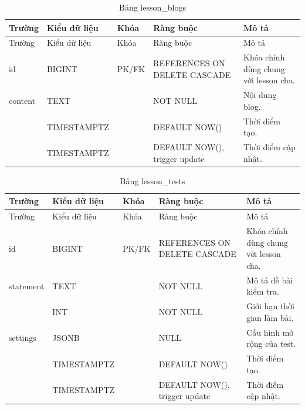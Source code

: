 \documentclass[12pt,a4paper]{report}
\begin{document}
\begin{longtable}{L{2.35cm} L{2.1cm} L{1.15cm} L{3.25cm} L{4.85cm}}
\caption{Bảng lesson\_blogs}\label{tab:db-lesson-blogs}\\
\toprule
Trường & Kiểu dữ liệu & Khóa & Ràng buộc & Mô tả \\
\midrule
\endfirsthead\toprule Trường & Kiểu dữ liệu & Khóa & Ràng buộc & Mô tả \\\midrule\endhead
id & BIGINT & PK/FK & REFERENCES  ON DELETE CASCADE & Khóa chính dùng chung với lesson cha. \\
content & TEXT & & NOT NULL & Nội dung blog. \\
 & TIMESTAMPTZ & & DEFAULT NOW() & Thời điểm tạo. \\
 & TIMESTAMPTZ & & DEFAULT NOW(), trigger update & Thời điểm cập nhật. \\

\bottomrule
\end{longtable}

\begin{longtable}{L{2.35cm} L{2.1cm} L{1.15cm} L{3.25cm} L{4.85cm}}
\caption{Bảng lesson\_tests}\label{tab:db-lesson-tests}\\
\toprule
Trường & Kiểu dữ liệu & Khóa & Ràng buộc & Mô tả \\
\midrule
\endfirsthead\toprule Trường & Kiểu dữ liệu & Khóa & Ràng buộc & Mô tả \\\midrule\endhead
id & BIGINT & PK/FK & REFERENCES  ON DELETE CASCADE & Khóa chính dùng chung với lesson cha. \\
statement & TEXT & & NOT NULL & Mô tả đề bài kiểm tra. \\
 & INT & & NOT NULL & Giới hạn thời gian làm bài. \\
settings & JSONB & & NULL & Cấu hình mở rộng của test. \\
 & TIMESTAMPTZ & & DEFAULT NOW() & Thời điểm tạo. \\
 & TIMESTAMPTZ & & DEFAULT NOW(), trigger update & Thời điểm cập nhật. \\

\bottomrule
\end{longtable}
\end{document}
